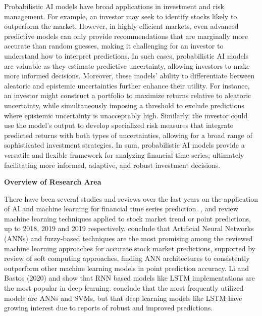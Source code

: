 Probabilistic AI models have broad applications in investment and risk management. For example, an investor may seek to identify stocks likely to outperform the market. However, in highly efficient markets, even advanced predictive models can only provide recommendations that are marginally more accurate than random guesses, making it challenging for an investor to understand how to interpret predictions. In such cases, probabilistic AI models are valuable as they estimate predictive uncertainty, allowing investors to make more informed decisions. Moreover, these models' ability to differentiate between aleatoric and epistemic uncertainties further enhance their utility. For instance, an investor might construct a portfolio to maximize returns relative to aleatoric uncertainty, while simultaneously imposing a threshold to exclude predictions where epistemic uncertainty is unacceptably high. Similarly, the investor could use the model’s output to develop specialized risk measures that integrate predicted returns with both types of uncertainties, allowing for a broad range of sophisticated investment strategies. In sum, probabilistic AI models provide a versatile and flexible framework for analyzing financial time series, ultimately facilitating more informed, adaptive, and robust investment decisions.


\textbf{Overview of Research Area}\nopagebreak

There have been several studies and reviews over the last years on the application of AI and machine learning for financial time series prediction. \textcite{gandhmalstockmarket2019}, \textcite{Li2020} and \textcite{Kumbure2022} review machine learning techniques applied to stock market trend or point predictions, up to 2018, 2019 and 2019 respectively. \textcite{gandhmalstockmarket2019} conclude that Artificial Neural Networks (ANNs) and fuzzy-based techniques are the most promising among the reviewed machine learning approaches for accurate stock market predictions, supported by \textcite{shi2019soft} review of soft computing approaches, finding ANN architectures to consistently outperform other machine learning models in point prediction accuracy. Li and Bastos (2020) and \textcite{sezer2020financial} show that RNN based models like LSTM implementations are the most popular in deep learning. \textcite{Kumbure2022} conclude that the most frequently utilized models are ANNs and SVMs, but that deep learning models like LSTM have growing interest due to reports of robust and improved predictions. 

